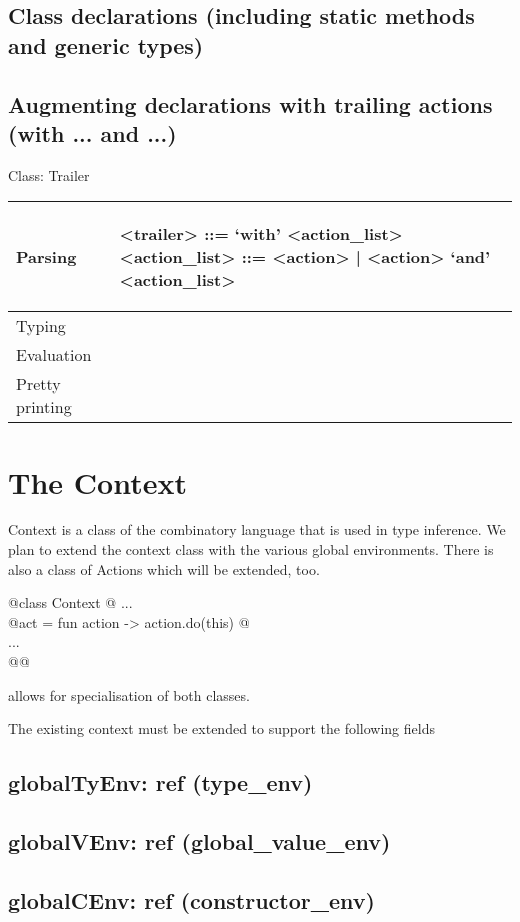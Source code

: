 \documentclass[12pt]{article}
\begin{document}
\subsection{Class declarations  (including static methods and generic types)}
\subsection{Augmenting declarations with trailing actions (with ... and ...)}
Class: Trailer

\begin{tabular}{|l|p{15cm}|}
\hline
Parsing & \begin{grammar}
<trailer> ::= `with' <action_list>
<action_list> ::= <action> | <action> `and' <action_list>
\end{grammar}  
   \\
\hline
Typing & 
\\
\hline
Evaluation  \\
\hline
Pretty printing &  \\
\hline
\end{tabular} 

\section{The Context}

Context is a class of the combinatory language that is used in type
inference.  We plan to extend the context class with the various
global environments.  There is also a class of Actions which will be
extended, too.

\begin{program}
@class Context {@ ... \\ 
@act = { fun action -> action.do(this) }@  \\
... \\
@}@ 
\end{program}
allows for specialisation of both classes. 

The existing context must be
extended to support the following fields

\subsection{globalTyEnv: ref (type_env)}
\subsection{globalVEnv: ref (global_value_env) }
\subsection{globalCEnv: ref (constructor_env) }
\end{document}
